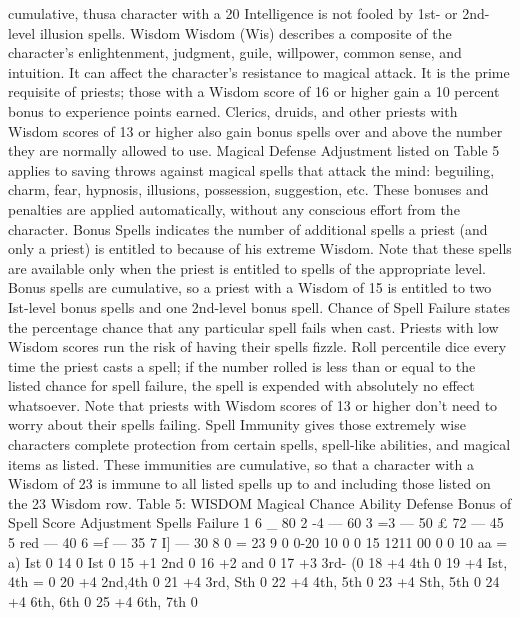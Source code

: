\documentclass[../main.tex]{subfiles}
\begin{document}
\begin{multicols}{3}
cumulative, thusa character with a 20 Intelligence is not fooled by 1st- or 2nd-level illusion spells.
Wisdom
Wisdom (Wis) describes a composite of the character's enlightenment, judgment, guile, willpower,
common sense, and intuition. It can affect
the character's resistance to magical attack.
It is the prime requisite of priests; those with
a Wisdom score of 16 or higher gain a 10
percent bonus to experience points earned.
Clerics, druids, and other priests with Wisdom scores of 13 or higher also gain bonus
spells over and above the number they are
normally allowed to use.
Magical Defense Adjustment listed on
Table 5 applies to saving throws against
magical spells that attack the mind: beguiling, charm, fear, hypnosis, illusions, possession, suggestion, etc. These bonuses and
penalties are applied automatically, without
any conscious effort from the character.
Bonus Spells indicates the number of additional spells a priest (and only a priest) is
entitled to because of his extreme Wisdom.
Note that these spells are available only
when the priest is entitled to spells of the appropriate level. Bonus spells are cumulative, so a priest with a Wisdom of 15 is
entitled to two Ist-level bonus spells and
one 2nd-level bonus spell.
Chance of Spell Failure states the percentage chance that any particular spell fails
when cast. Priests with low Wisdom scores
run the risk of having their spells fizzle. Roll
percentile dice every time the priest casts a
spell; if the number rolled is less than or
equal to the listed chance for spell failure,
the spell is expended with absolutely no effect whatsoever. Note that priests with Wisdom scores of 13 or higher don’t need to
worry about their spells failing.
Spell Immunity gives those extremely wise
characters complete protection from certain
spells, spell-like abilities, and magical items as
listed. These immunities are cumulative, so
that a character with a Wisdom of 23 is immune to all listed spells up to and including
those listed on the 23 Wisdom row.
Table 5: WISDOM
Magical Chance
Ability Defense Bonus of Spell
Score Adjustment Spells Failure
1 6 _ 80%
2 -4 — 60%
3 =3 — 50%
£ 72 — 45%
5 red — 40%
6 =f — 35%
7 I] — 30%
8 0 = 23%
9 0 0-20
10 0 0 15%
1211 00 0 0 10%
aa = a) Ist 0%
14 0 Ist 0%
15 +1 2nd 0%
16 +2 and 0%
17 +3 3rd- (0%
18 +4 4th 0%
19 +4 Ist, 4th = 0%
20 +4 2nd,4th 0%
21 +4 3rd, Sth 0%
22 +4 4th, 5th 0%
23 +4 Sth, 5th 0%
24 +4 6th, 6th 0%
25 +4 6th, 7th 0%

\end{multicols}
\end{document}
